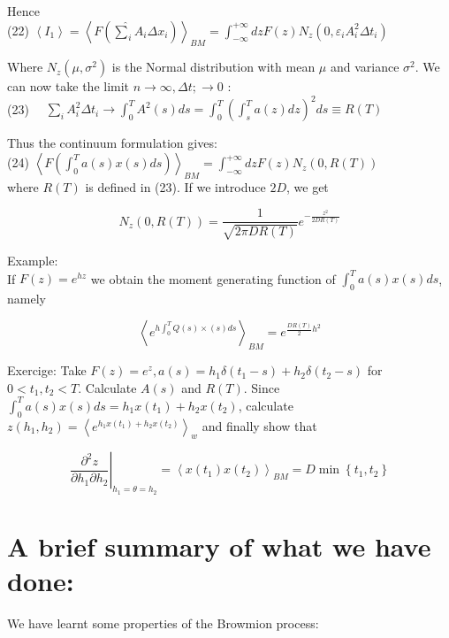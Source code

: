 \documentclass[10pt]{article}
\begin{document}
Hence\\
(22) $\left\langle I_{1}\right\rangle=\left\langle F\left(\hat{\sum}_{i} A_{i} \Delta x_{i}\right)\right\rangle_{B M}=\int_{-\infty}^{+\infty} d z F(z) N_{z}\left(0, \varepsilon_{i} A_{i}^{2} \Delta t_{i}\right)$

Where $N_{z}\left(\mu, \sigma^{2}\right)$ is the Normal distribution with mean $\mu$ and variance $\sigma^{2}$. We can now take the limit $n \rightarrow \infty, \Delta t ; \rightarrow 0$ :\\
(23) $\quad \sum_{i} A_{i}^{2} \Delta t_{i} \longrightarrow \int_{0}^{T} A^{2}(s) d s=\int_{0}^{T}\left(\int_{s}^{T} a(z) d z\right)^{2} d s \equiv R(T)$

Thus the continuum formulation gives:\\
(24) $\left\langle F\left(\int_{0}^{T} a(s) x(s) d s\right)\right\rangle_{B M}=\int_{-\infty}^{+\infty} d z F(z) N_{z}(0, R(T))$\\
where $R(T)$ is defined in (23). If we introduce $2 D$, we get

$$
N_{z}(0, R(T))=\frac{1}{\sqrt{2 \pi D R(T)}} e^{-\frac{z^{2}}{2 D R(T)}}
$$

Example:\\
If $F(z)=e^{h z}$ we obtain the moment generating function of $\int_{0}^{T} a(s) x(s) d s$, namely

$$
\left\langle e^{h \int_{0}^{T} Q(s) \times(s) d s}\right\rangle_{B M}=e^{\frac{D R(T)}{2} h^{2}}
$$

Exercige: Take $F(z)=e^{z}, a(s)=h_{1} \delta\left(t_{1}-s\right)+h_{2} \delta\left(t_{2}-s\right)$ for $0<t_{1}, t_{2}<T$. Calculate $A(s)$ and $R(T)$. Since $\int_{0}^{T} a(s) x(s) d s=h_{1} x\left(t_{1}\right)+h_{2} x\left(t_{2}\right)$, calculate $z\left(h_{1}, h_{2}\right)=\left\langle e^{h_{1} x\left(t_{1}\right)+h_{2} x\left(t_{2}\right)}\right\rangle_{w}$ and finally show that


\begin{equation*}
\left.\frac{\partial^{2} z}{\partial h_{1} \partial h_{2}}\right|_{h_{1}=\theta=h_{2}}=\left\langle x\left(t_{1}\right) x\left(t_{2}\right)\right\rangle_{B M}=D \min \left\{t_{1}, t_{2}\right\} \tag{19}
\end{equation*}


\section*{A brief summary of what we have done:}
We have learnt some properties of the Browmion process:
\end{document}
